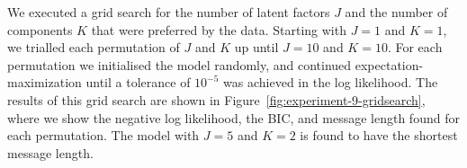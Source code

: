 \documentclass[twocolumn]{aastex62}
\newcommand{\project}[1]{\textsl{#1}}
\newcommand{\Galah}{\project{Galah}}
\newcommand{\todo}[1]{\textcolor{red}{#1}}
\newcommand{\NumLatentFactors}{J}
\newcommand{\NumComponents}{K}
\begin{document}

We executed a grid search for the number of latent factors $\NumLatentFactors$
and the number of components $\NumComponents$ that were preferred by the data.
Starting with $\NumLatentFactors = 1$ and $\NumComponents = 1$, we trialled each
permutation of $\NumLatentFactors$ and $\NumComponents$ up until $\NumLatentFactors = 10$
and $\NumComponents = 10$. For each permutation we initialised the model randomly,
and continued expectation-maximization until a tolerance of $10^{-5}$ was achieved
in the log likelihood. The results of this grid search are shown in Figure~\ref{fig:experiment-9-gridsearch},
where we show the negative log likelihood, the BIC, and message length found for each permutation.
The model with $J = 5$ and $K = 2$ is found to have the shortest message length.
\end{document}
